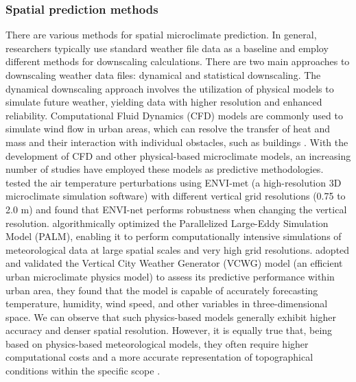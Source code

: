 \documentclass[a4paper,fleqn]{cas-sc}
\begin{document}
\subsubsection{Spatial prediction methods}

There are various methods for spatial microclimate prediction. In general, researchers typically use standard weather file data as a baseline and employ different methods for downscaling calculations. There are two main approaches to downscaling weather data files: dynamical and statistical downscaling. The dynamical downscaling approach involves the utilization of physical models to simulate future weather, yielding data with higher resolution and enhanced reliability. Computational Fluid Dynamics (CFD) models are commonly used to simulate wind flow in urban areas, which can resolve the transfer of heat and mass and their interaction with individual obstacles, such as buildings \citep{toparlar2017review}. With the development of CFD and other physical-based microclimate models, an increasing number of studies have employed these models as predictive methodologies. \cite{crank2018evaluating} tested the air temperature perturbations using ENVI-met (a high-resolution 3D microclimate simulation software) with different vertical grid resolutions (0.75 to 2.0 m) and found that ENVI-net performs robustness when changing the vertical resolution. \cite{maronga2015parallelized} algorithmically optimized the Parallelized Large-Eddy Simulation Model (PALM), enabling it to perform computationally intensive simulations of meteorological data at large spatial scales and very high grid resolutions. \cite{moradi2021vertical} adopted and validated the Vertical City Weather Generator (VCWG) model (an efficient urban microclimate physics model) to assess its predictive performance within urban area, they found that the model is capable of accurately forecasting temperature, humidity, wind speed, and other variables in three-dimensional space. We can observe that such physics-based models generally exhibit higher accuracy and denser spatial resolution. However, it is equally true that, being based on physics-based meteorological models, they often require higher computational costs and a more accurate representation of topographical conditions within the specific scope \citep{p2021comparative}. 
\end{document}

